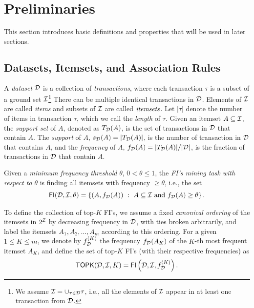 \section{Preliminaries}\label{sec:vcmineprelim}

This section introduces basic definitions and properties that will be used in later sections.

\subsection{Datasets, Itemsets, and Association Rules}\label{sec:vcminepreldm}
A \emph{dataset} ${\cal D}$ is a collection of \emph{transactions}, where each
transaction $\tau$ is a subset of a ground set ${\cal I}$\footnote{We assume
${\cal I}=\cup_{\tau\in{\cal D}} \tau$, i.e., all the elements of ${\cal I}$ appear in at
least one transaction from ${\cal D}$.} There can be multiple
identical transactions in ${\cal D}$. Elements of ${\cal I}$ are called \emph{items} and
subsets of ${\cal I}$ are called $\emph{itemsets}$. Let $|\tau|$ denote the number
of items in transaction $\tau$, which we call the \emph{length} of $\tau$. Given
an itemset $A\subseteq{\cal I}$, the \emph{support set} of $A$, denoted as
$T_{\cal D}(A)$, is the set of transactions in ${\cal D}$ that contain $A$. The
\emph{support} of $A$, $s_{\cal D}(A) =|T_{\cal D}(A)|$, is the number of transaction
in ${\cal D}$ that contains $A$, and the \emph{frequency} of $A$, $f_{\cal D}(A)=
|T_{\cal D}(A)|/|{\cal D}|$, is the fraction of transactions in ${\cal D}$ that contain
$A$.
\begin{definition}\label{def:vcmineminethreshold}
  Given a \emph{minimum frequency
  threshold} $\theta$, $0<\theta\le 1$, the \emph{FI's mining task with respect
  to $\theta$} is finding all itemsets with frequency $\geq\theta$, i.e., the
  set 
  \[ \mathsf{FI}({\cal D},{\cal I},\theta)=\left\{(A,f_{\cal D}(A)) ~:~ A \subseteq{\cal I} \mbox{ and }
  f_{{\cal D}}(A)\ge \theta\right\}.  \]
\end{definition}
  To define the collection of top-$K$ FI's, we assume a fixed \textit{canonical
  ordering} of the itemsets in $2^{\cal I}$ by decreasing frequency in ${\cal D}$, with
  ties broken arbitrarily, and label the itemsets $A_1,A_2,\dotsc,A_m$ according
  to this ordering.  For a given $1 \leq K \leq m$, we denote by
  $f^{(K)}_{\cal D}$ the frequency $f_{\cal D}(A_K)$ of the $K$-th most frequent itemset
  $A_K$, and define the set of top-$K$ FI's  (with their respective frequencies)
  as
  \begin{equation}\label{eq:topkfiequiv}
    \mathsf{TOPK}({\cal D},{\cal I},K)= \mathsf{FI}\left({\cal D},{\cal I},f^{(K)}_{\cal D}\right).
  \end{equation}

